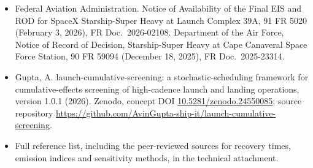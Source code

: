 \documentclass[11pt]{article}
\begin{document}
\begin{itemize}[leftmargin=*, itemsep=1pt]
\item Federal Aviation Administration. Notice of Availability of the Final EIS and ROD for SpaceX Starship-Super Heavy at Launch Complex 39A, 91 FR 5020 (February 3, 2026), FR Doc.\ 2026-02108. Department of the Air Force, Notice of Record of Decision, Starship-Super Heavy at Cape Canaveral Space Force Station, 90 FR 59094 (December 18, 2025), FR Doc.\ 2025-23314.
\item Gupta, A. launch-cumulative-screening: a stochastic-scheduling framework for cumulative-effects screening of high-cadence launch and landing operations, version 1.0.1 (2026). Zenodo, concept DOI \href{https://doi.org/10.5281/zenodo.24550085}{10.5281/zenodo.24550085}; source repository \url{https://github.com/AvinGupta-ship-it/launch-cumulative-screening}.
\item Full reference list, including the peer-reviewed sources for recovery times, emission indices and sensitivity methods, in the technical attachment.
\end{itemize}
\end{document}
